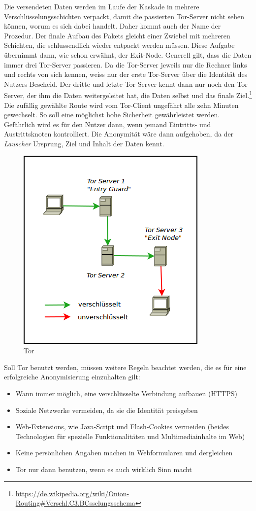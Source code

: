 Die versendeten Daten werden im Laufe der Kaskade in mehrere Verschlüsselungsschichten verpackt, damit die passierten Tor-Server nicht sehen können, worum es sich dabei handelt. Daher kommt auch der Name der Prozedur. Der finale Aufbau des Pakets gleicht einer Zwiebel mit mehreren Schichten, die  schlussendlich wieder entpackt werden müssen. Diese Aufgabe übernimmt dann, wie schon erwähnt, der Exit-Node. Generell gilt, dass die Daten immer drei Tor-Server passieren. Da die Tor-Server jeweils nur die Rechner links und rechts von sich kennen, weiss nur der erste Tor-Server über die Identität des Nutzers Bescheid. Der dritte und letzte Tor-Server kennt dann nur noch den Tor-Server, der ihm die Daten weitergeleitet hat, die Daten selbst und das finale Ziel.\footnote{\url{https://de.wikipedia.org/wiki/Onion-Routing\#Verschl.C3.BCsselungsschema}}
Die zufällig gewählte Route wird vom Tor-Client ungefährt alle zehn Minuten gewechselt. So soll eine möglichst hohe Sicherheit gewährleistet werden. Gefährlich wird es für den Nutzer dann, wenn jemand Eintritts- und Austrittsknoten kontrolliert. Die Anonymität wäre dann aufgehoben, da der \textit{Lauscher} Ursprung, Ziel und Inhalt der Daten kennt.

\begin{figure}[h]
\centering
\includegraphics[scale=0.7]{images/tor}
\caption{Tor}
\end{figure}

Soll Tor benutzt werden, müssen weitere Regeln beachtet werden, die es für eine erfolgreiche Anonymisierung einzuhalten gilt:
\begin{itemize}
\item Wann immer möglich, eine verschlüsselte Verbindung aufbauen (HTTPS)
\item Soziale Netzwerke vermeiden, da sie die Identität preisgeben
\item Web-Extensions, wie Java-Script und Flash-Cookies vermeiden (beides Technologien für spezielle Funktionalitäten und Multimediainhalte im Web)
\item Keine persönlichen Angaben machen in Webformularen und dergleichen
\item Tor nur dann benutzen, wenn es auch wirklich Sinn macht
\end{itemize}

